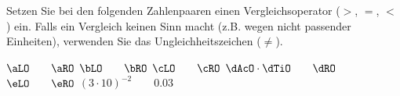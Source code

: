 Setzen Sie bei den folgenden Zahlenpaaren einen Vergleichsoperator ($>$, $=$, $<$) ein. Falls ein Vergleich keinen Sinn macht (z.B. wegen nicht passender Einheiten), verwenden Sie das Ungleichheitszeichen ($\neq$).

\begin{abcliste}
\abc $\aLO \qquad \aRO$
\abc $\bLO \qquad \bRO$
\abc $\cLO \qquad \cRO$
\abc $\dAcO\cdot\dTiO \qquad \dRO$
\abc $\eLO \qquad \eRO$
\abc $\left(3\cdot 10\right)^{-2} \qquad 0.03$
\end{abcliste}

